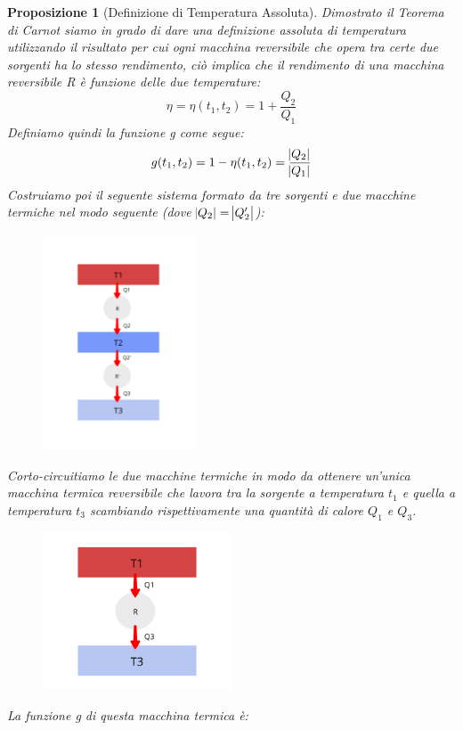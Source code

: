 \documentclass{article}
\newtheorem{prop}[defn]{Proposizione}
\begin{document}
\begin{prop}[Definizione di Temperatura Assoluta]
Dimostrato il Teorema di Carnot siamo in grado di dare una definizione assoluta di temperatura utilizzando il risultato per cui ogni macchina reversibile che opera tra certe due sorgenti ha lo stesso rendimento, ciò implica che il rendimento di una macchina reversibile R è funzione delle due temperature:
\[\eta=\eta(t_1,t_2)=1+\frac{Q_2}{Q_1}\]
Definiamo quindi la funzione g come segue:
\[g(t_1,t_2)=1-\eta(t_1,t_2)=\frac{\abs{Q_2}}{\abs{Q_1}}\]
Costruiamo poi il seguente sistema formato da tre sorgenti e due macchine termiche nel modo seguente (dove $\abs{Q_2}=\abs{Q_2'}$):
\begin{figure}[H]
    \centering
    \includegraphics[width=0.4\textwidth]{TemperaturaAssoluta.png}
    \label{TeoremaCarnot2}
\end{figure}
Corto-circuitiamo le due macchine termiche in modo da ottenere un'unica macchina termica reversibile che lavora tra la sorgente a temperatura $t_1$ e quella a temperatura $t_3$ scambiando rispettivamente una quantità di calore $Q_1$ e $Q_3$.
\begin{figure}[H]
    \centering
    \includegraphics[width=0.5\textwidth]{TempAss.png}
\end{figure}
La funzione g di questa macchina termica è:

\end{prop}
\end{document}
